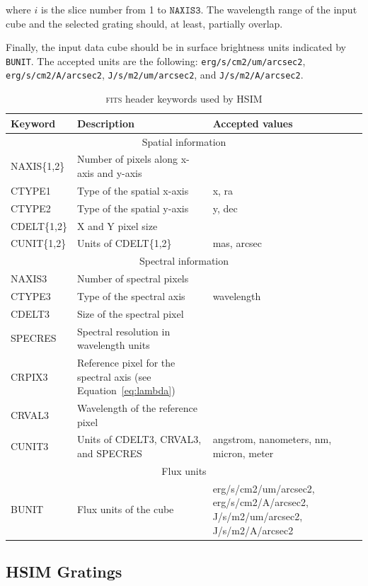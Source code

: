 \documentclass[12pt]{report}
\begin{document}
where $i$ is the slice number from 1 to $\texttt{NAXIS3}$. The wavelength range of the input cube and the selected grating should, at least, partially overlap.

Finally, the input data cube should be in surface brightness units indicated by \texttt{BUNIT}. The accepted units are the following: \texttt{erg/s/cm2/um/arcsec2}, \texttt{erg/s/cm2/A/arcsec2}, \texttt{J/s/m2/um/arcsec2}, and \texttt{J/s/m2/A/arcsec2}.


\begin{table}[h]
\footnotesize
\centering
\caption{\textsc{fits} header keywords used by HSIM}
\label{tab:fits_header}
\begin{tabular}{lp{75mm}p{50mm}}
\hline
Keyword & Description & Accepted values \\
\hline
\multicolumn{3}{c}{Spatial information}\\
\hline
NAXIS\{1,2\} & Number of pixels along x-axis and y-axis\\
CTYPE1 & Type of the spatial x-axis & x, ra \\
CTYPE2 & Type of the spatial y-axis & y, dec \\
CDELT\{1,2\} & X and Y pixel size \\
CUNIT\{1,2\} & Units of CDELT\{1,2\} & mas, arcsec\\
\hline
\multicolumn{3}{c}{Spectral information}\\
\hline
NAXIS3 & Number of spectral pixels \\
CTYPE3 & Type of the spectral axis & wavelength \\
CDELT3 & Size of the spectral pixel \\
SPECRES & Spectral resolution in wavelength units &  \\
CRPIX3 & Reference pixel for the spectral axis (see Equation~\ref{eq:lambda}) \\
CRVAL3 & Wavelength of the reference pixel\\
CUNIT3 & Units of CDELT3, CRVAL3, and SPECRES & angstrom, nanometers, nm, \hbox{micron}, meter \\
\hline
\multicolumn{3}{c}{Flux units}\\
\hline
BUNIT & Flux units of the cube & erg/s/cm2/um/arcsec2, erg/s/cm2/A/arcsec2,
J/s/m2/um/arcsec2, J/s/m2/A/arcsec2 \\
\hline
\end{tabular}
\end{table}


\subsection{HSIM Gratings}
\end{document}
